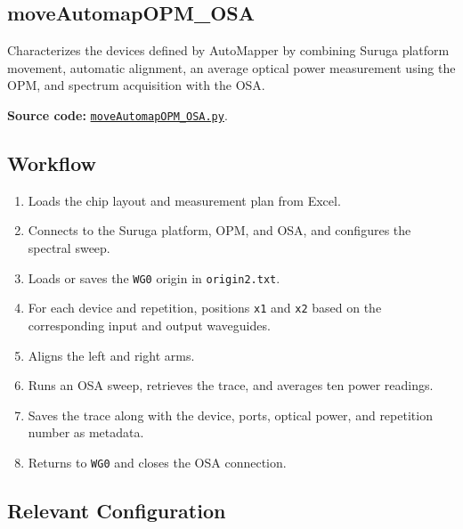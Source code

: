 \subsection{moveAutomapOPM\_OSA}

Characterizes the devices defined by AutoMapper by combining Suruga platform
movement, automatic alignment, an average optical power measurement using the
OPM, and spectrum acquisition with the OSA.

\textbf{Source code:}
\href{https://github.com/niospinamev2/SurugaSeikiHex/blob/main/rutinas/moveAutomapOPM_OSA.py}
{\texttt{moveAutomapOPM\_OSA.py}}.

\subsection{Workflow}

\begin{enumerate}
    \item Loads the chip layout and measurement plan from Excel.

    \item Connects to the Suruga platform, OPM, and OSA, and configures the
    spectral sweep.

    \item Loads or saves the \texttt{WG0} origin in \texttt{origin2.txt}.

    \item For each device and repetition, positions \texttt{x1} and
    \texttt{x2} based on the corresponding input and output waveguides.

    \item Aligns the left and right arms.

    \item Runs an OSA sweep, retrieves the trace, and averages ten power
    readings.

    \item Saves the trace along with the device, ports, optical power, and
    repetition number as metadata.

    \item Returns to \texttt{WG0} and closes the OSA connection.
\end{enumerate}

\subsection{Relevant Configuration}

